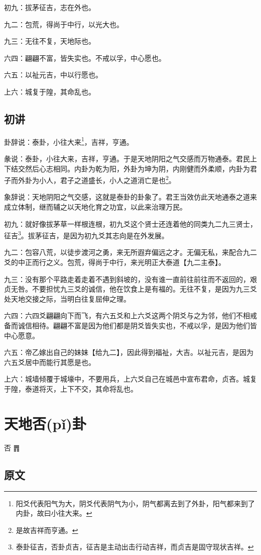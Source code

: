\documentclass[12pt,oneside]{book}
\begin{document}
初九：拔茅征吉，志在外也。

九二：包荒，得尚于中行，以光大也。

九三：无往不复，天地际也。

六四：翩翩不富，皆失实也。不戒以孚，中心愿也。

六五：以祉元吉，中以行愿也。

上六：城复于隍，其命乱也。

\section{初讲}
卦辞说：泰卦，小往大来\footnote{阳爻代表阳气为大，阴爻代表阴气为小，阴气都离去到了外卦，阳气都来到了内卦，故曰小往大来。}，吉祥，亨通。

彖说：泰卦，小往大来，吉祥，亨通。于是天地阴阳之气交感而万物通泰。君民上下结交然后心志相同。内卦为乾为阳，外卦为坤为阴，内刚健而外柔顺，内卦为君子而外卦为小人，君子之道盛长，小人之道消亡是也\footnote{是故吉祥而亨通。}。

象辞说：天地阴阳之气交感，这就是泰卦的卦象了。君王当效仿此天地通泰之道来成立体制，继而辅之以天地化育之功宜，以此来治理万民。

初九：就好像拔茅草一样根连根，初九爻这个贤士还连着他的同类九二九三贤士，征吉\footnote{泰卦征吉，否卦贞吉，征吉是主动出击行动吉祥，而贞吉是固守现状吉祥。}。拔茅征吉，是因为初九爻其志向是在外发展。

九二：包容八荒，以徒步渡河之勇，来无所遐弃偏远之才。无偏无私，来配合九二爻的中正而行之义。包荒，得尚于中行，来光明正大泰道【九二主泰】。

九三：没有那个平路走着走着不遇到斜坡的，没有谁一直前往前往而不返回的，艰贞无咎。不要担忧九三爻的诚信，他在饮食上是有福的。无往不复，是因为九三爻处天地交接之际，当明白往复屈伸之理。

六四：六四爻翩翩向下而飞，有六五爻和上六爻这两个阴爻与之为邻，他们不相戒备而诚信相待。翩翩不富是因为他们都是阴爻皆失实也，不戒以孚，是因为他们皆中心愿意。

六五：帝乙嫁出自己的妹妹【给九二】，因此得到福祉，大吉。以祉元吉，是因为六五爻居中而能行其愿是也。

上六：城墙倾覆于城壕中，不要用兵，上六爻自己在城邑中宣布君命，贞吝。城复于隍，泰道将灭，上下不交，其命将乱也。


\chapter{天地否(pǐ)卦}
否 {\Large ䷋}

\section{原文}
\end{document}
